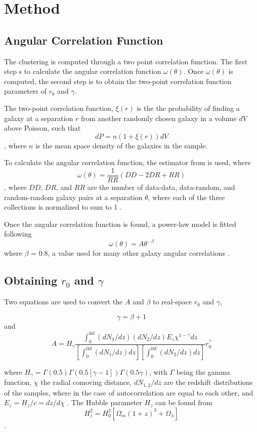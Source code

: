\section{Method}

\subsection{Angular Correlation Function}

The clustering is computed through a two point correlation function. The first step s to calculate the angular correlation function $ \omega(\theta)$. Once $ \omega(\theta)$ is computed, the second step is to obtain the two-point correlation function parameters of $r_0$ and $\gamma$.

The two-point correlation function, $ \xi(r)$ is the the probability of finding a galaxy at a separation $r$ from another randomly chosen galaxy in a volume $dV$ above Poisson, such that $$ dP = n(1 + \xi(r))dV $$, where $n$ is the mean space density of the galaxies in the sample\cite{hickox2011clustering}. 

To calculate the angular correlation function, the estimator from \cite{1993ApJ...412...64L} is used, where $$ \omega(\theta) = \frac{1}{RR}(DD-2DR + RR)$$, where $DD$, $DR$, and $RR$ are the number of data-data, data-random, and random-random galaxy pairs at a separation $\theta$, where each of the three collections is normalized to sum to 1 \cite{hickox2011clustering}.

Once the angular correlation function is found, a power-law model is fitted following $$\omega(\theta) = A\theta^{-\beta} $$ where $\beta$ = 0.8, a value used for many other galaxy angular correlations \cite{hickox2011clustering}.

\subsection{Obtaining $r_0$ and $\gamma$}

Two equations are used to convert the $A$ and $\beta$ to real-space $r_0$ and $\gamma$, 

$$ \gamma = \beta + 1 $$ and $$ A = H_{\gamma}\frac{\int_{0}^{\inf} (dN_1/dz)(dN_2/dz)E_z\chi^{1 - \gamma} dz}{[\int_{0}^{\inf} (dN_1/dz)dz][\int_{0}^{\inf} (dN_2/dz)dz]}r_0^{\gamma}$$

where $H_{\gamma} = \Gamma(0.5)\Gamma(0.5[\gamma -1])\Gamma(0.5\gamma)$, with $\Gamma$ being the gamma function, $\chi$ the radial comoving distance, $dN_{1,2}/dz$ are the redshift distributions of the samples, where in the case of autocorrelation are equal to each other, and $E_z = H_z/c = dz/d\chi$ \cite{hickox2011clustering}. The Hubble parameter $H_z$ can be found from
$$H_z^2 = H_0^2[\Omega_m(1+z)^3 + \Omega_{\lambda}]$$ \cite{hickox2011clustering}.

